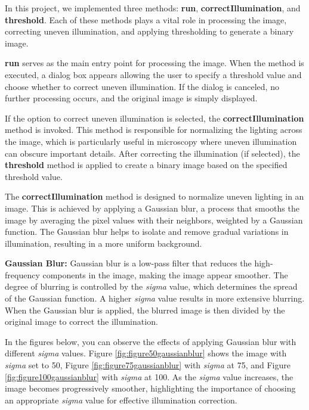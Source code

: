 \documentclass[%
	a4paper, %
	12pt, %
	english, %
	bibtotoc %
]{scrartcl}
\begin{document}
In this project, we implemented three methods: \textbf{run}, \textbf{correctIllumination}, and \textbf{threshold}. Each of these methods plays a vital role in processing the image, correcting uneven illumination, and applying thresholding to generate a binary image.

\textbf{run} serves as the main entry point for processing the image. When the method is executed, a dialog box appears allowing the user to specify a threshold value and choose whether to correct uneven illumination. If the dialog is canceled, no further processing occurs, and the original image is simply displayed.

If the option to correct uneven illumination is selected, the \textbf{correctIllumination} method is invoked. This method is responsible for normalizing the lighting across the image, which is particularly useful in microscopy where uneven illumination can obscure important details. After correcting the illumination (if selected), the \textbf{threshold} method is applied to create a binary image based on the specified threshold value.

The \textbf{correctIllumination} method is designed to normalize uneven lighting in an image. This is achieved by applying a Gaussian blur, a process that smooths the image by averaging the pixel values with their neighbors, weighted by a Gaussian function. The Gaussian blur helps to isolate and remove gradual variations in illumination, resulting in a more uniform background.

\textbf{Gaussian Blur:} Gaussian blur is a low-pass filter that reduces the high-frequency components in the image, making the image appear smoother. The degree of blurring is controlled by the \textit{sigma} value, which determines the spread of the Gaussian function. A higher \textit{sigma} value results in more extensive blurring. When the Gaussian blur is applied, the blurred image is then divided by the original image to correct the illumination.

In the figures below, you can observe the effects of applying Gaussian blur with different \textit{sigma} values. Figure \ref{fig:figure50gaussianblur} shows the image with \textit{sigma} set to 50, Figure \ref{fig:figure75gaussianblur} with \textit{sigma} at 75, and Figure \ref{fig:figure100gaussianblur} with \textit{sigma} at 100. As the \textit{sigma} value increases, the image becomes progressively smoother, highlighting the importance of choosing an appropriate \textit{sigma} value for effective illumination correction.
\end{document}
